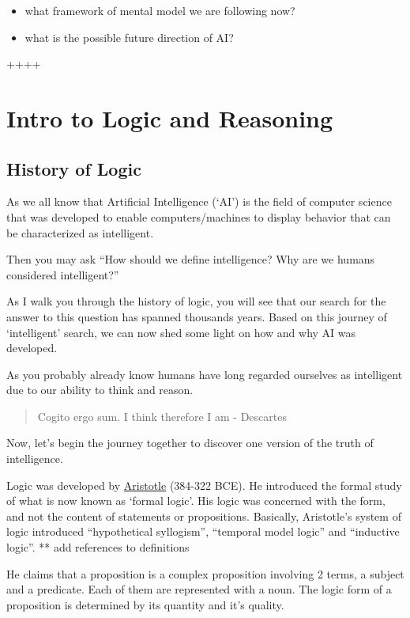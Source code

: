 \documentclass[]{book}
\providecommand{\tightlist}{%
  \setlength{\itemsep}{0pt}\setlength{\parskip}{0pt}}
\theoremstyle{definition}
\theoremstyle{definition}
\theoremstyle{definition}
\theoremstyle{remark}
\begin{document}
\begin{itemize}
\tightlist
\item
  what framework of mental model we are following now?
\item
  what is the possible future direction of AI?
\end{itemize}

++++

\chapter{Intro to Logic and
Reasoning}\label{intro-to-logic-and-reasoning}

\section{History of Logic}\label{history-of-logic}

As we all know that Artificial Intelligence (`AI') is the field of
computer science that was developed to enable computers/machines to
display behavior that can be characterized as intelligent.

Then you may ask ``How should we define intelligence? Why are we humans
considered intelligent?''

As I walk you through the history of logic, you will see that our search
for the answer to this question has spanned thousands years. Based on
this journey of `intelligent' search, we can now shed some light on how
and why AI was developed.

As you probably already know humans have long regarded ourselves as
intelligent due to our ability to think and reason.

\begin{quote}
Cogito ergo sum. I think therefore I am - Descartes
\end{quote}

Now, let's begin the journey together to discover one version of the
truth of intelligence.

Logic was developed by
\href{https://en.wikipedia.org/wiki/Aristotle}{Aristotle} (384-322 BCE).
He introduced the formal study of what is now known as `formal logic'.
His logic was concerned with the form, and not the content of statements
or propositions. Basically, Aristotle's system of logic introduced
``hypothetical syllogism'', ``temporal model logic'' and ``inductive
logic''. ** add references to definitions

He claims that a proposition is a complex proposition involving 2 terms,
a subject and a predicate. Each of them are represented with a noun. The
logic form of a proposition is determined by its quantity and it's
quality.
\end{document}
